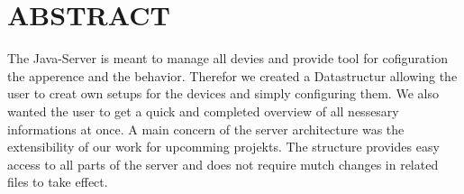 \section{ABSTRACT}
The Java-Server is meant to manage all devies and provide tool for cofiguration the apperence and the behavior. Therefor we created a Datastructur allowing the user to creat own setups for the devices and simply configuring them. We also wanted the user to get a quick and completed overview of all nessesary informations at once.
A main concern of the server architecture was the extensibility of our work for upcomming projekts. The structure provides easy access to all parts of the server and does not require mutch changes in related files to take effect.
